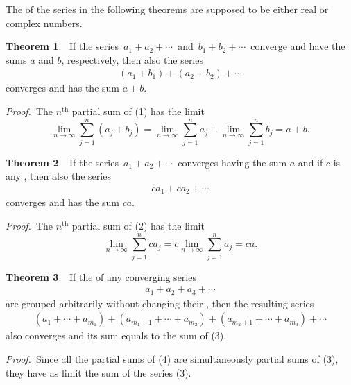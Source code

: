 \documentclass[12pt]{article}
\theoremstyle{definition}
\newtheorem{thmplain}{Theorem}
\begin{document}
The  of the series in the following theorems are supposed to be either real or complex numbers.

\begin{thmplain}
 \, If the series\, $a_1+a_2+\cdots$\, and\, $b_1+b_2+\cdots$\, converge and have the sums $a$ and $b$, respectively, then also the series
\begin{align}
           (a_1+b_1)+(a_2+b_2)+\cdots
\end{align}
converges and has the sum $a\!+\!b$.
\end{thmplain}

{\em Proof.} \,The $n^\mathrm{th}$ partial sum of (1) has the limit
$$\lim_{n\to\infty}\sum_{j = 1}^n(a_j+b_j) = 
\lim_{n\to\infty}\sum_{j = 1}^na_j+\lim_{n\to\infty}\sum_{j = 1}^nb_j = a\!+\!b.$$

\begin{thmplain}
 \, If the series\, $a_1+a_2+\cdots$\, converges having the sum $a$ and if $c$ is any , then also the series
\begin{align}
              ca_1+ca_2+\cdots
\end{align}
converges and has the sum $ca$.
\end{thmplain}

{\em Proof.} \,The $n^\mathrm{th}$ partial sum of (2) has the limit
$$\lim_{n\to\infty}\sum_{j = 1}^nca_j = c\lim_{n\to\infty}\sum_{j = 1}^na_j = 
ca.$$

\begin{thmplain}
 \, If the  of any converging series
\begin{align}
a_1+a_2+a_3+\cdots
\end{align}
are grouped arbitrarily without changing their , then the resulting series
\begin{align}
(a_1+\cdots+a_{m_1})+(a_{m_1+1}+\cdots+a_{m_2})+(a_{m_2+1}+\cdots+a_{m_3})+\cdots
\end{align}
also converges and its sum equals to the sum of (3).
\end{thmplain}

{\em Proof.} \,Since all the partial sums of (4) are simultaneously partial sums of (3), they have as limit the sum of the series (3).
\end{document}
